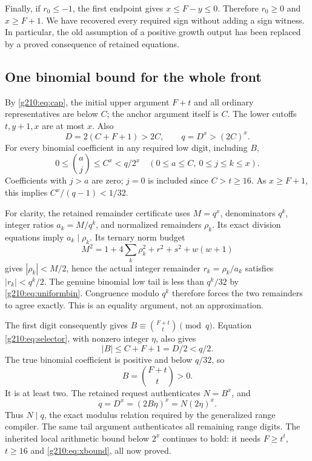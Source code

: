 Finally, if $r_0\le-1$, the first endpoint gives $x\le F-y\le0$.
Therefore $r_0\ge0$ and $x\ge F+1$. We have recovered every required sign
without adding a sign witness. In particular, the old assumption of a positive
growth output has been replaced by a proved consequence of retained equations.

\subsection{One binomial bound for the whole front}

By \eqref{g210:eq:cap}, the initial upper argument $F+t$ and all ordinary
representatives are below $C$; the anchor argument itself is $C$.
The lower cutoffs $t,y+1,x$ are at most $x$. Also
\[
D=2(C+F+1)>2C,\qquad q=D^x>(2C)^x.
\]
For every binomial coefficient in any required low digit, including $B$,
\begin{equation}\label{g210:eq:uniformbin}
0\le\binom{a}{j}\le C^x<q/2^x
\quad(0\le a\le C,\ 0\le j\le k\le x).
\end{equation}
Coefficients with $j>a$ are zero; $j=0$ is included since $C>t\ge16$.
As $x\ge F+1$, this implies $C^x/(q-1)<1/32$.

For clarity, the retained remainder certificate uses $M=q^x$, denominators
$q^k$, integer ratios $a_k=M/q^k$, and normalized remainders $\rho_k$.
Its exact division equations imply $a_k\mid\rho_k$. Its ternary norm budget
\[
M^2=1+4\sum_k\rho_k^2+r^2+s^2+w(w+1)
\]
gives $|\rho_k|<M/2$, hence the actual integer remainder
$r_k=\rho_k/a_k$ satisfies $|r_k|<q^k/2$. The genuine binomial low tail is
less than $q^k/32$ by \eqref{g210:eq:uniformbin}. Congruence modulo $q^k$
therefore forces the two remainders to agree exactly. This is an equality
argument, not an approximation.

The first digit consequently gives $B\equiv\binom{F+t}{t}\pmod q$.
Equation \eqref{g210:eq:selector}, with nonzero integer $\eta$, also gives
\[
|B|\le C+F+1=D/2<q/2.
\]
The true binomial coefficient is positive and below $q/32$, so
\begin{equation}\label{g210:eq:Bexact}
B=\binom{F+t}{t}>0.
\end{equation}
It is at least two. The retained request authenticates $N=B^x$, and
\[
q=D^x=(2B\eta)^x=N(2\eta)^x.
\]
Thus $N\mid q$, the exact modulus relation required by the generalized
range compiler. The same tail argument authenticates all remaining range
digits. The inherited local arithmetic bound below $2^x$ continues to hold:
it needs $F\ge t^t$, $t\ge16$ and \eqref{g210:eq:xbound}, all now proved.

